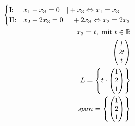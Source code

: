 \begin{align*}
    \begin{cases}
        \text{I:\@}  & x_1 - x_3 = 0 \quad | + x_3 \Leftrightarrow x_1 = x_3   \\
        \text{II:\@} & x_2 - 2x_3 = 0 \quad | +2x_3 \Leftrightarrow x_2 = 2x_3
    \end{cases} \\
    x_3 = t, \text{ mit } t \in \mathbb{R}                                 \\
    \begin{pmatrix}
        t \\ 2t \\ t
    \end{pmatrix}                                                         \\
    L = \left\{t \cdot \begin{pmatrix}
                           1 \\ 2 \\ 1
                       \end{pmatrix}\right\}                               \\
    span = \left\{\begin{pmatrix}
                      1 \\ 2 \\ 1
                  \end{pmatrix}\right\}
\end{align*}

